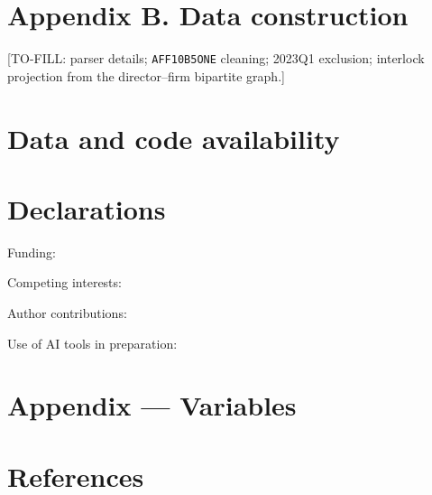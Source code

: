 \documentclass[
  a4paper,
]{article}
\begin{document}
\section{Appendix B. Data
construction}\label{appendix-b.-data-construction}

{[}TO-FILL: parser details; \texttt{AFF10B5ONE} cleaning; 2023Q1
exclusion; interlock projection from the director--firm bipartite
graph.{]}

\section{Data and code availability}\label{data-and-code-availability}

\section{Declarations}\label{declarations}

Funding:

Competing interests:

Author contributions:

Use of AI tools in preparation:

\section{Appendix --- Variables}\label{appendix-variables}

\section*{References}\label{references}
\end{document}
